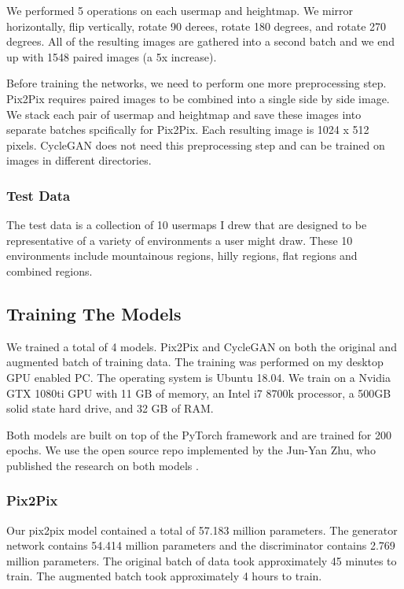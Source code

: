\documentclass[twocolumn]{article}
\begin{document}
	We performed 5 operations on each usermap and heightmap. We mirror horizontally, flip vertically, rotate 90 derees, rotate 180 degrees, and rotate 270 degrees.	All of the resulting images are gathered into a second batch and we end up with 1548 paired images (a 5x increase).
	
	Before training the networks, we need to perform one more preprocessing step. Pix2Pix requires paired images to be combined into a single side by side image. We stack each pair of usermap and heightmap and save these images into separate batches spcifically for Pix2Pix. Each resulting image is 1024 x 512 pixels. CycleGAN does not need this preprocessing step and can be trained on images in different directories.
			
	\subsubsection{Test Data}
	
	The test data is a collection of 10 usermaps I drew that are designed to be representative of a variety of environments a user might draw. These 10 environments include mountainous regions, hilly regions, flat regions and combined regions.
	
	\subsection{Training The Models}
	
	We trained a total of 4 models. Pix2Pix and CycleGAN on both the original and augmented batch of training data. The training was performed on my desktop GPU enabled PC. The operating system is Ubuntu 18.04. We train on a Nvidia GTX 1080ti GPU with 11 GB of memory, an Intel i7 8700k processor, a 500GB solid state hard drive, and 32 GB of RAM.
	
	Both models are built on top of the PyTorch framework \cite{paszke2019pytorch} and are trained for 200 epochs. We use the open source repo implemented by the Jun-Yan Zhu, who published the research on both models \cite{junyanzhu2017github}.
	
	\subsubsection{Pix2Pix}
		Our pix2pix model contained a total of 57.183 million parameters. The generator network contains 54.414 million parameters and the discriminator contains 2.769 million parameters. The original batch of data took approximately 45 minutes to train. The augmented batch took approximately 4 hours to train.
	
\end{document}
